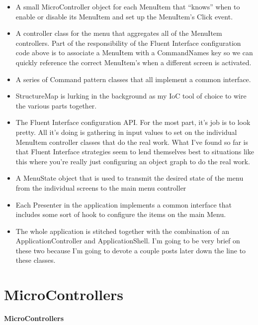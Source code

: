 \documentclass{article}
\begin{document}
{ \begin{itemize}
    \item  A small MicroController object for each MenuItem that “knows” when to enable or disable its MenuItem and set up the MenuItem's Click event.  
 \item  A controller class for the menu that aggregates all of the MenuItem controllers.  Part of the responsibility of the Fluent Interface configuration code above is to associate a MenuItem with a CommandNames key so we can quickly reference the correct MenuItem's when a different screen is activated.  
 \item  A series of Command pattern classes that all implement a common interface.   
 \item  StructureMap is lurking in the background as my IoC tool of choice to wire the various parts together.  
 \item  The Fluent Interface configuration API.  For the most part, it's job is to look pretty.  All it's doing is gathering in input values to set on the individual MenuItem controller classes that do the real work.  What I've found so far is that Fluent Interface strategies seem to lend themselves best to situations like this where you're really just configuring an object graph to do the real work.  
 \item  A MenuState object that is used to transmit the desired state of the menu from the individual screens to the main menu controller  
 \item  Each Presenter in the application implements a common interface that includes some sort of hook to configure the items on the main Menu.  
 \item  The whole application is stitched together with the combination of an ApplicationController and ApplicationShell.  I'm going to be very brief on these two because I'm going to devote a couple posts later down the line to these classes.  
 \end{itemize}

\section{ MicroControllers } 

\Large {\textbf{MicroControllers}}

}
\end{document}
